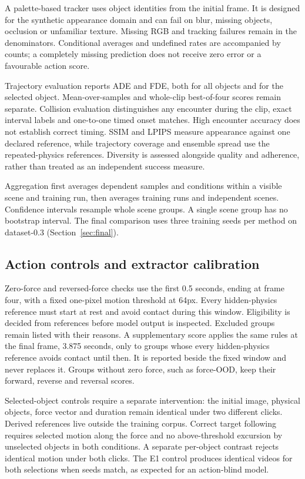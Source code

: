 \documentclass[11pt,a4paper]{article}
\begin{document}
A palette-based tracker uses object identities from the initial frame. It is designed for the synthetic appearance domain and can fail on blur, missing objects, occlusion or unfamiliar texture. Missing RGB and tracking failures remain in the denominators. Conditional averages and undefined rates are accompanied by counts; a completely missing prediction does not receive zero error or a favourable action score.

Trajectory evaluation reports ADE and FDE, both for all objects and for the selected object. Mean-over-samples and whole-clip best-of-four scores remain separate. Collision evaluation distinguishes any encounter during the clip, exact interval labels and one-to-one timed onset matches. High encounter accuracy does not establish correct timing. SSIM and LPIPS measure appearance against one declared reference, while trajectory coverage and ensemble spread use the repeated-physics references. Diversity is assessed alongside quality and adherence, rather than treated as an independent success measure.

Aggregation first averages dependent samples and conditions within a visible scene and training run, then averages training runs and independent scenes. Confidence intervals resample whole scene groups. A single scene group has no bootstrap interval. The final comparison uses three training seeds per method on dataset-0.3 (Section~\ref{sec:final}).

\subsection{Action controls and extractor calibration}
Zero-force and reversed-force checks use the first 0.5 seconds, ending at frame four, with a fixed one-pixel motion threshold at 64px. Every hidden-physics reference must start at rest and avoid contact during this window. Eligibility is decided from references before model output is inspected. Excluded groups remain listed with their reasons. A supplementary score applies the same rules at the final frame, 3.875 seconds, only to groups whose every hidden-physics reference avoids contact until then. It is reported beside the fixed window and never replaces it. Groups without zero force, such as force-OOD, keep their forward, reverse and reversal scores.

Selected-object controls require a separate intervention: the initial image, physical objects, force vector and duration remain identical under two different clicks. Derived references live outside the training corpus. Correct target following requires selected motion along the force and no above-threshold excursion by unselected objects in both conditions. A separate per-object contrast rejects identical motion under both clicks. The E1 control produces identical videos for both selections when seeds match, as expected for an action-blind model.
\end{document}
